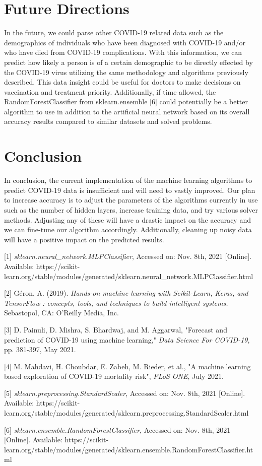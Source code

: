\documentclass[conference]{IEEEtran}
\begin{document}
\section{Future Directions}
In the future, we could parse other COVID-19 related data such as the demographics of individuals who have been diagnosed with COVID-19 and/or who have died from COVID-19 complications. With this information, we can predict how likely a person is of a certain demographic to be directly effected by the COVID-19 virus utilizing the same methodology and algorithms previously described. This data insight could be useful for doctors to make decisions on vaccination and treatment priority. Additionally, if time allowed, the RandomForestClassifier from sklearn.ensemble [6] could potentially be a better algorithm to use in addition to the artificial neural network based on its overall accuracy results compared to similar datasets and solved problems. 

\section{Conclusion}
In conclusion, the current implementation of the machine learning algorithms to predict COVID-19 data is insufficient and will need to vastly improved. Our plan to increase accuracy is to adjust the parameters of the algorithms currently in use such as the number of hidden layers, increase training data, and try various solver methods. Adjusting any of these will have a drastic impact on the accuracy and we can fine-tune our algorithm accordingly. Additionally, cleaning up noisy data will have a positive impact on the predicted results.




[1] \emph{sklearn.neural\_network.MLPClassifier}, Accessed on: Nov. 8th, 2021 [Online]. Available: https://scikit-learn.org/stable/modules/generated/sklearn.neural\_network.MLPClassifier.html 

[2] Géron, A. (2019). \emph{Hands-on machine learning with Scikit-Learn, Keras, and TensorFlow : concepts, tools, and techniques to build intelligent systems.} Sebastopol, CA: O'Reilly Media, Inc.

[3] D. Painuli, D. Mishra, S. Bhardwaj, and M. Aggarwal, "Forecast and prediction of COVID-19 using machine learning," \emph{Data Science For COVID-19}, pp. 381-397, May 2021. 

[4] M. Mahdavi, H. Choubdar, E. Zabeh, M. Rieder, et al., "A machine learning based exploration of COVID-19 mortality risk", \emph{PLoS ONE}, July 2021. 

[5] \emph{sklearn.preprocessing.StandardScaler}, Accessed on: Nov. 8th, 2021 [Online]. Available: https://scikit-learn.org/stable/modules/generated/sklearn.preprocessing.StandardScaler.html

[6] \emph{sklearn.ensemble.RandomForestClassifier}, Accessed on: Nov. 8th, 2021 [Online]. Available: https://scikit-learn.org/stable/modules/generated/sklearn.ensemble.RandomForestClassifier.html 
\end{document}
